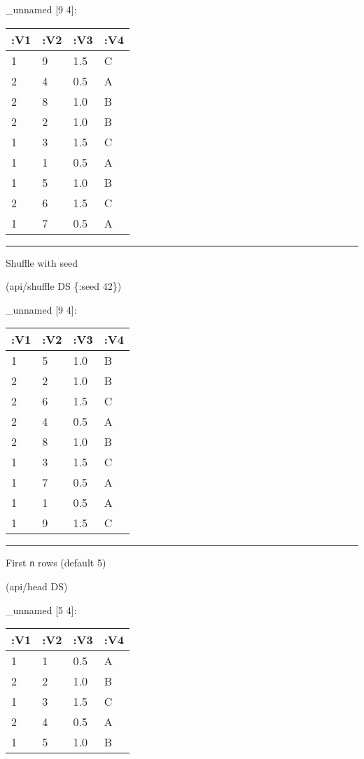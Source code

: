 \documentclass[]{article}
\newenvironment{Shaded}{\begin{snugshade}}{\end{snugshade}}
\newcommand{\AttributeTok}[1]{\textcolor[rgb]{0.77,0.63,0.00}{#1}}
\newcommand{\DecValTok}[1]{\textcolor[rgb]{0.00,0.00,0.81}{#1}}
\newcommand{\NormalTok}[1]{#1}
\begin{document}
\_unnamed {[}9 4{]}:

\begin{longtable}[]{@{}llll@{}}
\toprule
:V1 & :V2 & :V3 & :V4\tabularnewline
\midrule
\endhead
1 & 9 & 1.5 & C\tabularnewline
2 & 4 & 0.5 & A\tabularnewline
2 & 8 & 1.0 & B\tabularnewline
2 & 2 & 1.0 & B\tabularnewline
1 & 3 & 1.5 & C\tabularnewline
1 & 1 & 0.5 & A\tabularnewline
1 & 5 & 1.0 & B\tabularnewline
2 & 6 & 1.5 & C\tabularnewline
1 & 7 & 0.5 & A\tabularnewline
\bottomrule
\end{longtable}

\begin{center}\rule{0.5\linewidth}{0.5pt}\end{center}

Shuffle with seed

\begin{Shaded}
\begin{Highlighting}[]
\NormalTok{(api/shuffle DS \{}\AttributeTok{:seed} \DecValTok{42}\NormalTok{\})}
\end{Highlighting}
\end{Shaded}

\_unnamed {[}9 4{]}:

\begin{longtable}[]{@{}llll@{}}
\toprule
:V1 & :V2 & :V3 & :V4\tabularnewline
\midrule
\endhead
1 & 5 & 1.0 & B\tabularnewline
2 & 2 & 1.0 & B\tabularnewline
2 & 6 & 1.5 & C\tabularnewline
2 & 4 & 0.5 & A\tabularnewline
2 & 8 & 1.0 & B\tabularnewline
1 & 3 & 1.5 & C\tabularnewline
1 & 7 & 0.5 & A\tabularnewline
1 & 1 & 0.5 & A\tabularnewline
1 & 9 & 1.5 & C\tabularnewline
\bottomrule
\end{longtable}

\begin{center}\rule{0.5\linewidth}{0.5pt}\end{center}

First \texttt{n} rows (default 5)

\begin{Shaded}
\begin{Highlighting}[]
\NormalTok{(api/head DS)}
\end{Highlighting}
\end{Shaded}

\_unnamed {[}5 4{]}:

\begin{longtable}[]{@{}llll@{}}
\toprule
:V1 & :V2 & :V3 & :V4\tabularnewline
\midrule
\endhead
1 & 1 & 0.5 & A\tabularnewline
2 & 2 & 1.0 & B\tabularnewline
1 & 3 & 1.5 & C\tabularnewline
2 & 4 & 0.5 & A\tabularnewline
1 & 5 & 1.0 & B\tabularnewline
\bottomrule
\end{longtable}
\end{document}
